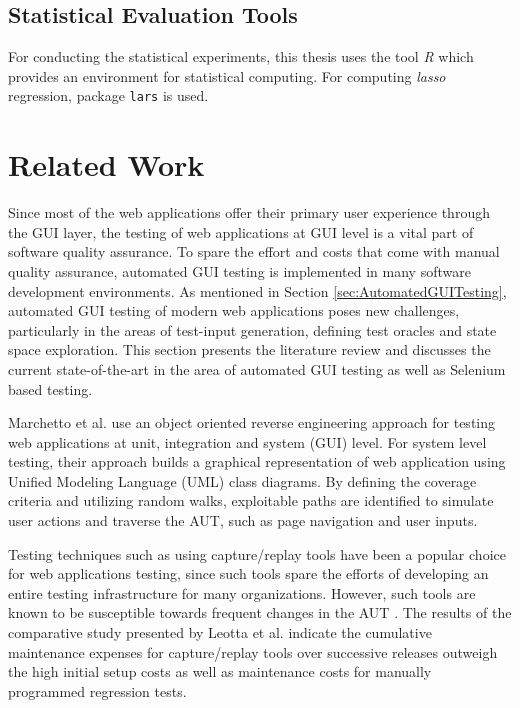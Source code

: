 \subsection{Statistical Evaluation Tools}
For conducting the statistical experiments, this thesis uses the tool \textit{R} \cite{Rtool} which provides an environment for statistical computing. For computing \textit{lasso} regression, package \texttt{lars} \cite{larspack} is used. 
\section{Related Work}
\label{sec:relatedWork}

Since most of the web applications offer their primary user experience through the GUI layer, the testing of web applications at GUI level is a vital part of software quality assurance. To spare the effort and costs that come with manual quality assurance, automated GUI testing is implemented in many software development environments. As mentioned in Section \ref{sec:AutomatedGUITesting}, automated GUI testing of modern web applications poses new challenges, particularly in the areas of test-input generation, defining test oracles and state space exploration. This section presents the literature review and discusses the current state-of-the-art in the area of automated GUI testing as well as Selenium \cite{websiteSelenium} based testing. 

Marchetto et al. \cite{Marchetto2006} use an object oriented reverse engineering approach for testing web applications at unit, integration and system (GUI) level. For system level testing, their approach builds a graphical representation of web application using Unified Modeling Language (UML) class diagrams. By defining the coverage criteria and utilizing random walks, exploitable paths are identified to simulate user actions and traverse the AUT, such as page navigation and user inputs.

Testing techniques such as using capture/replay tools have been a popular choice for web applications testing, since such tools spare the efforts of developing an entire testing infrastructure for many organizations. However, such tools are known to be susceptible towards frequent changes in the AUT \cite{sjosten2006costs}. The results of the comparative study presented by Leotta et al. \cite{leotta2013capture} indicate the cumulative maintenance expenses for capture/replay tools over successive releases outweigh the high initial setup costs as well as maintenance costs for manually programmed regression tests. 

